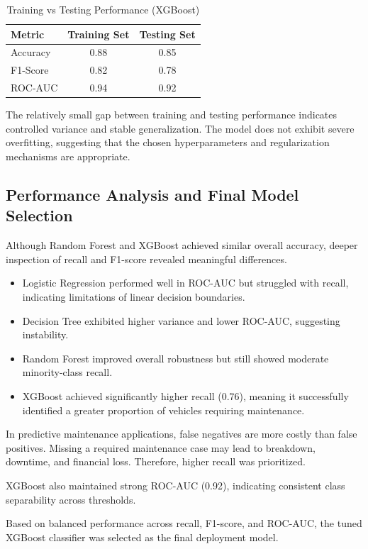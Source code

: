 \documentclass[12pt, a4paper]{article}
\begin{document}
\begin{table}[H]
\centering
\caption{Training vs Testing Performance (XGBoost)}
\begin{tabular}{lcc}
\toprule
Metric & Training Set & Testing Set \\
\midrule
Accuracy & 0.88 & 0.85 \\
F1-Score & 0.82 & 0.78 \\
ROC-AUC & 0.94 & 0.92 \\
\bottomrule
\end{tabular}
\end{table}

The relatively small gap between training and testing performance indicates controlled variance and stable generalization. The model does not exhibit severe overfitting, suggesting that the chosen hyperparameters and regularization mechanisms are appropriate.
\subsection{Performance Analysis and Final Model Selection}

Although Random Forest and XGBoost achieved similar overall accuracy, deeper inspection of recall and F1-score revealed meaningful differences.

\begin{itemize}
\item Logistic Regression performed well in ROC-AUC but struggled with recall, indicating limitations of linear decision boundaries.
\item Decision Tree exhibited higher variance and lower ROC-AUC, suggesting instability.
\item Random Forest improved overall robustness but still showed moderate minority-class recall.
\item XGBoost achieved significantly higher recall (0.76), meaning it successfully identified a greater proportion of vehicles requiring maintenance.
\end{itemize}

In predictive maintenance applications, false negatives are more costly than false positives. Missing a required maintenance case may lead to breakdown, downtime, and financial loss. Therefore, higher recall was prioritized.

XGBoost also maintained strong ROC-AUC (0.92), indicating consistent class separability across thresholds.

Based on balanced performance across recall, F1-score, and ROC-AUC, the tuned XGBoost classifier was selected as the final deployment model.
\newpage
\end{document}

